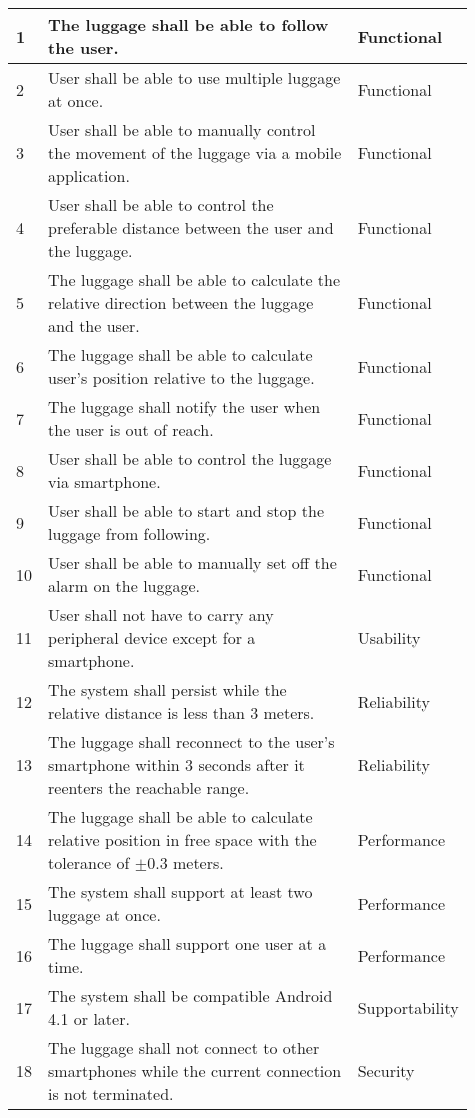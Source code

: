 \begin{center}
\begin{longtable} {|p{0.03\linewidth}|p{0.72\linewidth}|p{0.16\linewidth}|}
\hline
1 & The luggage shall be able to follow the user. & Functional\\	\hline
2 & User shall be able to use multiple luggage at once. & Functional\\	\hline
3 & User shall be able to manually control the movement of the luggage via a mobile application. & Functional\\	\hline
4 & User shall be able to control the preferable distance between the user and the luggage. & Functional\\	\hline
5 & The luggage shall be able to calculate the relative direction between the luggage and the user. & Functional\\	\hline
6 & The luggage shall be able to calculate user's position relative to the luggage. & Functional\\	\hline
7 & The luggage shall notify the user when the user is out of reach. & Functional\\	\hline
8 & User shall be able to control the luggage via smartphone. & Functional\\	\hline
9 & User shall be able to start and stop the luggage from following. & Functional\\	\hline
10 & User shall be able to manually set off the alarm on the luggage. & Functional\\	\hline
11 & User shall not have to carry any peripheral device except for a smartphone. & Usability\\	\hline
12 & The system shall persist while the relative distance is less than 3 meters. & Reliability\\	\hline
13 & The luggage shall reconnect to the user's smartphone within 3 seconds after it reenters the reachable range. & Reliability\\	\hline
14 & The luggage shall be able to calculate relative position in free space with the tolerance of $ \pm $0.3 meters. & Performance\\	\hline
15 & The system shall support at least two luggage at once. & Performance\\	\hline
16 & The luggage shall support one user at a time. & Performance\\	\hline
17 & The system shall be compatible Android 4.1 or later. & Supportability\\	\hline
18 & The luggage shall not connect to other smartphones while the current connection is not terminated. & Security\\	\hline
\end{longtable}
\end{center}

